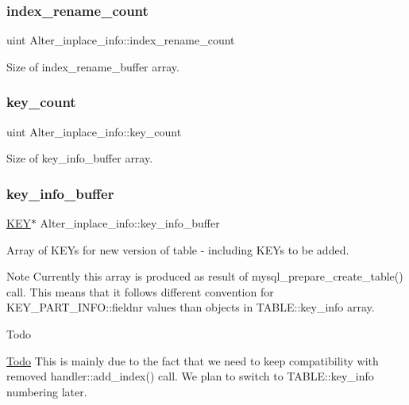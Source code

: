 \subsubsection{\texorpdfstring{index\+\_\+rename\+\_\+count}{index\_rename\_count}}
{\footnotesize\ttfamily uint Alter\+\_\+inplace\+\_\+info\+::index\+\_\+rename\+\_\+count}

Size of index\+\_\+rename\+\_\+buffer array. \mbox{\label{classAlter__inplace__info_a06a73897d45e7a856647d308fae2bc95}} 
\subsubsection{\texorpdfstring{key\+\_\+count}{key\_count}}
{\footnotesize\ttfamily uint Alter\+\_\+inplace\+\_\+info\+::key\+\_\+count}

Size of key\+\_\+info\+\_\+buffer array. \mbox{\label{classAlter__inplace__info_a1774915f106804ab1aeb6629d58bcae4}} 
\subsubsection{\texorpdfstring{key\+\_\+info\+\_\+buffer}{key\_info\_buffer}}
{\footnotesize\ttfamily \mbox{\hyperlink{structst__key}{K\+EY}}$\ast$ Alter\+\_\+inplace\+\_\+info\+::key\+\_\+info\+\_\+buffer}

Array of K\+E\+Ys for new version of table -\/ including K\+E\+Ys to be added.

\begin{DoxyNote}{Note}
Currently this array is produced as result of mysql\+\_\+prepare\+\_\+create\+\_\+table() call. This means that it follows different convention for K\+E\+Y\+\_\+\+P\+A\+R\+T\+\_\+\+I\+N\+F\+O\+::fieldnr values than objects in T\+A\+B\+L\+E\+::key\+\_\+info array.
\end{DoxyNote}
\begin{DoxyRefDesc}{Todo}
\item[\mbox{\hyperlink{todo__todo000024}{Todo}}]This is mainly due to the fact that we need to keep compatibility with removed handler\+::add\+\_\+index() call. We plan to switch to T\+A\+B\+L\+E\+::key\+\_\+info numbering later.\end{DoxyRefDesc}


